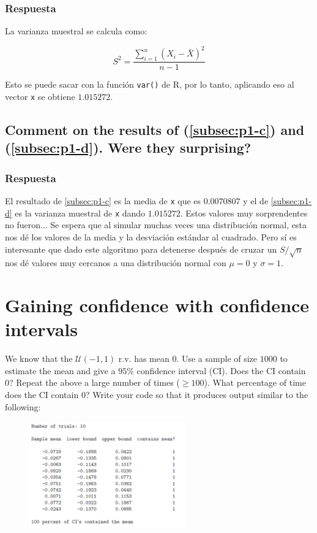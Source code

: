 \documentclass[12pt]{article}\usepackage[]{graphicx}\usepackage[]{xcolor}
\begin{document}
\subsubsection{Respuesta}

La varianza muestral se calcula como:

\[
S^{2} = \frac{\sum_{i=1}^{n} (X_{i} - \bar{X})^{2}}{n-1}
\]

Esto se puede sacar con la función \lstinline|var()| de \textsf{R}, por lo tanto, aplicando eso al vector \lstinline|x| se obtiene $1.015272$.



\subsection{Comment on the results of (\ref{subsec:p1-c}) and (\ref{subsec:p1-d}). Were they surprising?}
\label{subsec:p1-e}

\subsubsection{Respuesta}

El resultado de \ref{subsec:p1-c} es la media de \lstinline|x| que es $0.0070807$ y el de \ref{subsec:p1-d} es la varianza muestral de \lstinline|x| dando $1.015272$. Estos valores muy sorprendentes no fueron... Se espera que al simular muchas veces una distribución normal, esta nos dé los valores de la media y la desviación estándar al cuadrado. Pero sí es interesante que dado este algoritmo para detenerse después de cruzar un $S / \sqrt{n}$ nos dé valores muy cercanos a una distribución normal con $\mu = 0$ y $\sigma = 1$.


\newpage

\section{Gaining confidence with confidence intervals}

We know that the $\mathcal{U}(-1, 1)$ r.v. has mean 0. Use a sample of size $1000$ to estimate the mean and give a $95\%$ confidence interval (CI). Does the CI contain 0? Repeat the above a large number of times ($\geq  100$). What percentage of time does the CI contain 0? Write your code so that it produces output similar to the following:

\begin{figure}[ht]
  \centering
  \includegraphics[width=0.6\textwidth]{img/Punto2.png}
\end{figure}
\end{document}
